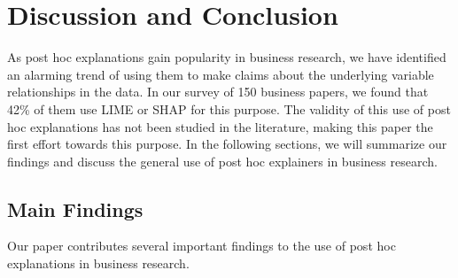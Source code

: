 \documentclass[12pt]{article}  %
\begin{document}
\vspace{-3mm}\section{Discussion and Conclusion}
  \label{sec:discussion}\vspace{-3mm}
  As post hoc explanations gain popularity in business research, we have identified an alarming trend of using them to make claims about the underlying variable relationships in the data. In our survey of 150 business papers, we found that 42\% of them use LIME or SHAP for this purpose. The validity of this use of post hoc explanations has not been studied in the literature, making this paper the first effort towards this purpose. In the following sections, we will summarize our findings and discuss the general use of post hoc explainers in business research.

\vspace{-3mm}
  \subsection{Main Findings}\vspace{-3mm}
    Our paper contributes several important findings to the use of post hoc explanations in business research.
\end{document}
